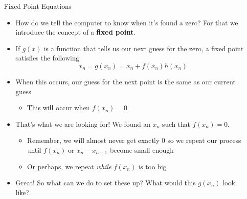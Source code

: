 {}\documentclass[letterpaper,
compress,
xcolor=x11names,
]{beamer}
\begin{document}
\begin{frame}{Fixed Point Equations}
	\footnotesize
	\begin{itemize}
		\item How do we tell the computer to know when it's found a zero? For that we introduce the concept of a \textbf{fixed point}. 
		\item If $g(x)$ is a function that tells us our next guess for the zero, a fixed point satisfies the following
		\begin{equation*}
			x_n = g(x_n) = x_n + f(x_n)h(x_n)
		\end{equation*}
		\item When this occurs, our guess for the next point is the same as our current guess
		\begin{itemize}
			\item This will occur when $f(x_n) = 0$
		\end{itemize}
		\item That's what we are looking for! We found an $x_n$ such that $f(x_n)=0$.
		\begin{itemize}
			\item Remember, we will almost never get exactly 0 so we repeat our process until $f(x_n)$ or $x_n - x_{n-1}$ become small enough
			\item Or perhaps, we repeat \textit{while} $f(x_n)$ is too big
		\end{itemize}
		\item Great! So what can we do to set these up? What would this $g(x_n)$ look like?
	\end{itemize}
\end{frame}
\end{document}
